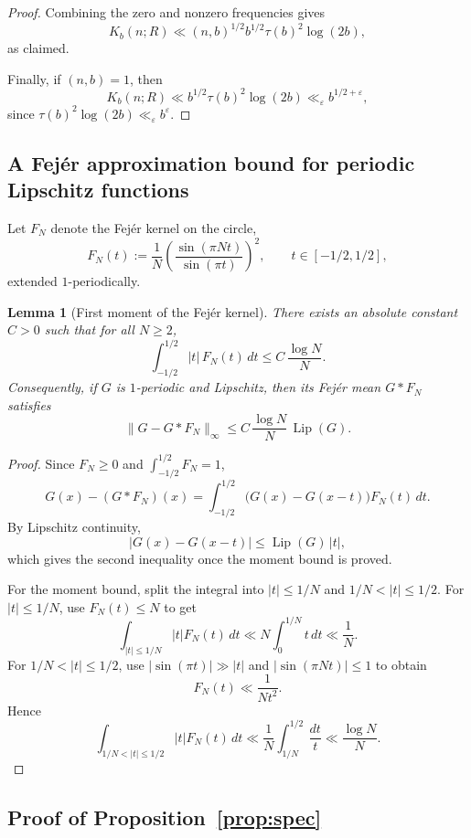 \documentclass[a4paper,american,11pt]{amsart}
\theoremstyle{plain}
\newtheorem{lemma}[theorem]{Lemma}
\theoremstyle{definition}
\begin{document}
\begin{proof}
Combining the zero and nonzero frequencies gives
\[
K_b(n;R)\ll (n,b)^{1/2}b^{1/2}\tau(b)^2\log(2b),
\]
as claimed.

Finally, if \((n,b)=1\), then
\[
K_b(n;R)\ll b^{1/2}\tau(b)^2\log(2b)\ll_\varepsilon b^{1/2+\varepsilon},
\]
since \(\tau(b)^2\log(2b)\ll_\varepsilon b^\varepsilon\).
\end{proof}


\subsection{A Fej\'er approximation bound for periodic Lipschitz functions}

Let \(F_N\) denote the Fej\'er kernel on the circle,
\[
F_N(t):=\frac{1}{N}\left(\frac{\sin(\pi N t)}{\sin(\pi t)}\right)^2,\qquad t\in[-1/2,1/2],
\]
extended \(1\)-periodically.

\begin{lemma}[First moment of the Fej\'er kernel]
\label{lem:fejer_moment}
There exists an absolute constant \(C>0\) such that for all \(N\ge2\),
\[
\int_{-1/2}^{1/2} |t|\,F_N(t)\,dt\le C\,\frac{\log N}{N}.
\]
Consequently, if \(G\) is \(1\)-periodic and Lipschitz, then its Fej\'er mean \(G*F_N\) satisfies
\[
\|G-G*F_N\|_{\infty}\le C\,\frac{\log N}{N}\,\operatorname{Lip}(G).
\]
\end{lemma}

\begin{proof}
Since \(F_N\ge0\) and \(\int_{-1/2}^{1/2}F_N=1\),
\[
G(x)-(G*F_N)(x)=\int_{-1/2}^{1/2}\bigl(G(x)-G(x-t)\bigr)F_N(t)\,dt.
\]
By Lipschitz continuity,
\[
|G(x)-G(x-t)|\le \operatorname{Lip}(G)\,|t|,
\]
which gives the second inequality once the moment bound is proved.

For the moment bound, split the integral into \(|t|\le 1/N\) and \(1/N<|t|\le 1/2\).
For \(|t|\le 1/N\), use \(F_N(t)\le N\) to get
\[
\int_{|t|\le 1/N}|t|F_N(t)\,dt
\ll
N\int_0^{1/N} t\,dt
\ll
\frac1N.
\]
For \(1/N<|t|\le 1/2\), use \(|\sin(\pi t)|\gg |t|\) and \(|\sin(\pi Nt)|\le1\) to obtain
\[
F_N(t)\ll \frac{1}{Nt^2}.
\]
Hence
\[
\int_{1/N<|t|\le1/2}|t|F_N(t)\,dt
\ll
\frac1N\int_{1/N}^{1/2}\frac{dt}{t}
\ll
\frac{\log N}{N}.
\]
\end{proof}

\subsection{Proof of Proposition~\ref{prop:spec}}
\end{document}
